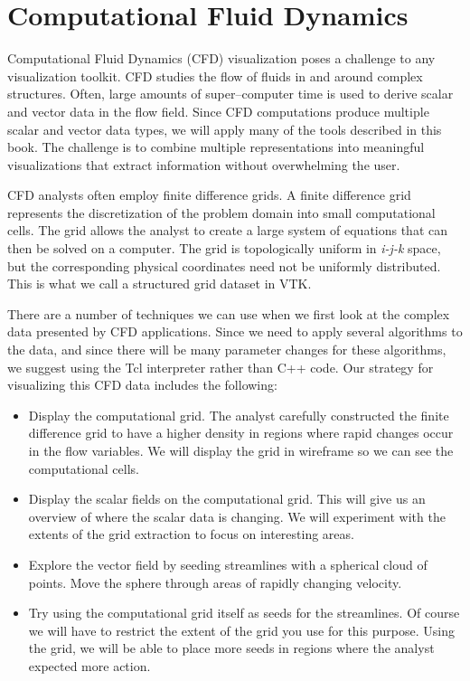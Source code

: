 \section{Computational Fluid Dynamics}

Computational Fluid Dynamics (CFD) visualization poses a challenge to any visualization toolkit.
CFD studies the flow of fluids in and around complex structures.
Often, large amounts of super--computer time is used to derive scalar and vector data in the flow field.
Since CFD computations produce multiple scalar and vector data types, we will apply many of the tools described in this book.
The challenge is to combine multiple representations into meaningful visualizations that extract information without overwhelming the user.

CFD analysts often employ finite difference grids.
A finite difference grid represents the discretization of the problem domain into small computational cells.
The grid allows the analyst to create a large system of equations that can then be solved on a computer.
The grid is topologically uniform in \emph{i-j-k} space, but the corresponding physical coordinates need not be uniformly distributed.
This is what we call a structured grid dataset in VTK.

There are a number of techniques we can use when we first look at the complex data presented by CFD applications.
Since we need to apply several algorithms to the data, and since there will be many parameter changes for these algorithms, we suggest using the Tcl interpreter rather than C++ code.
Our strategy for visualizing this CFD data includes the following:

\begin{itemize}

    \item Display the computational grid. The analyst carefully constructed the finite difference grid to have a higher density in regions where rapid changes occur in the flow variables. We will display the grid in wireframe so we can see the computational cells.

    \item Display the scalar fields on the computational grid. This will give us an overview of where the scalar data is changing. We will experiment with the extents of the grid extraction to focus on interesting areas.

    \item Explore the vector field by seeding streamlines with a spherical cloud of points. Move the sphere through areas of rapidly changing velocity.

    \item Try using the computational grid itself as seeds for the streamlines. Of course we will have to restrict the extent of the grid you use for this purpose. Using the grid, we will be able to place more seeds in regions where the analyst expected more action.

\end{itemize}

